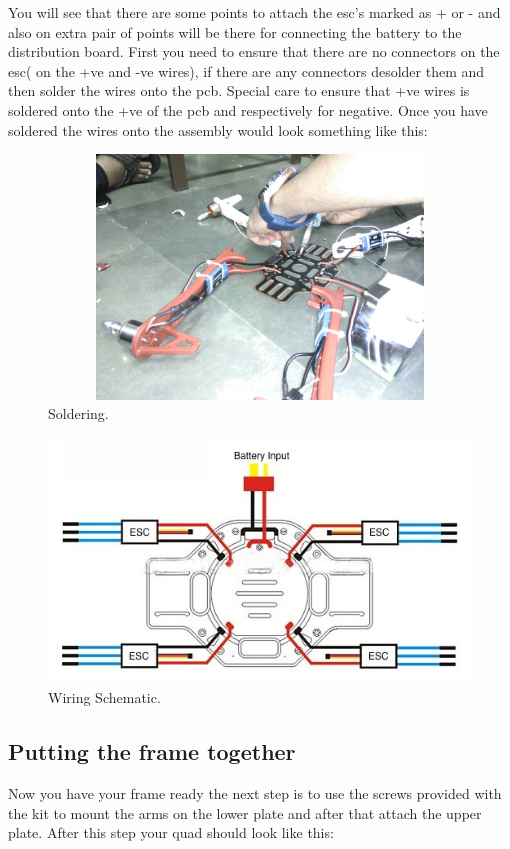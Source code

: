 \documentclass[11pt,a4paper]{article}
\begin{document}
You will see that there are some points to attach the esc's marked as + or - and also on extra pair of points will be there for connecting the battery to the distribution board. First you need to ensure that there are no connectors on the esc( on the +ve and -ve wires), if there are any connectors desolder them and then solder the wires onto the pcb. Special care to ensure that +ve wires is soldered onto the +ve of the pcb and respectively for negative. Once you have soldered the wires onto the assembly would look something like this:
		\begin{figure}[h]
	 	
	 	\centering
		\includegraphics[width=12cm,height=6.5cm]{solder}
		\caption{Soldering.}
		\end{figure}
		
		\begin{figure}[h]
	 	
	 	\centering
		\includegraphics[width=12cm,height=6.5cm]{wiring}
		\caption{Wiring Schematic.}
		\end{figure}
		
		\subsection{Putting the frame together}
		Now you have your frame ready the next step is to use the screws provided with the kit to mount the arms on the lower plate and after that attach the upper plate. After this step your quad should look like this:
\end{document}
